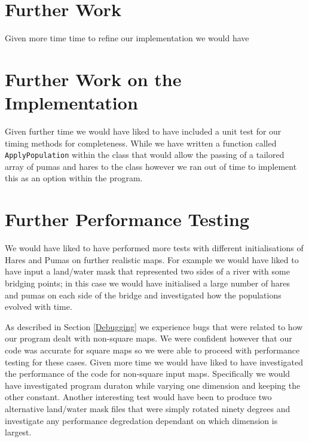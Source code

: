 \section{Further Work}
\label{Further Work}

Given more time time to refine our implementation we would have 

\section{Further Work on the Implementation}
Given further time we would have liked to have included a unit test for our timing methods for completeness.
While we have written a function called \texttt{ApplyPopulation} within the  class that would allow the passing of a tailored array of pumas and hares to the class however we ran out of time to implement this as an option within the program. 

\section{Further Performance Testing}

We would have liked to have performed more tests with different initialisations of Hares and Pumas on further realistic maps. For example we would have liked to have input a land/water mask that represented two sides of a river with some bridging points; in this case we would have initialised a large number of hares and pumas on each side of the bridge and investigated how the populations evolved with time.   

As described in Section \ref{Debugging} we experience bugs that were related to how our program dealt with non-square maps. We were confident however that our code was accurate for square maps so we were able to proceed with performance testing for these cases. 
Given more time we would have liked to have investigated the performance of the code for non-square input maps.
Specifically we would have investigated program duraton while varying one dimension and keeping the other constant. Another interesting test would have been to produce two alternative land/water mask files that were simply rotated ninety degrees and investigate any performance degredation dependant on which dimension is largest. 



 
